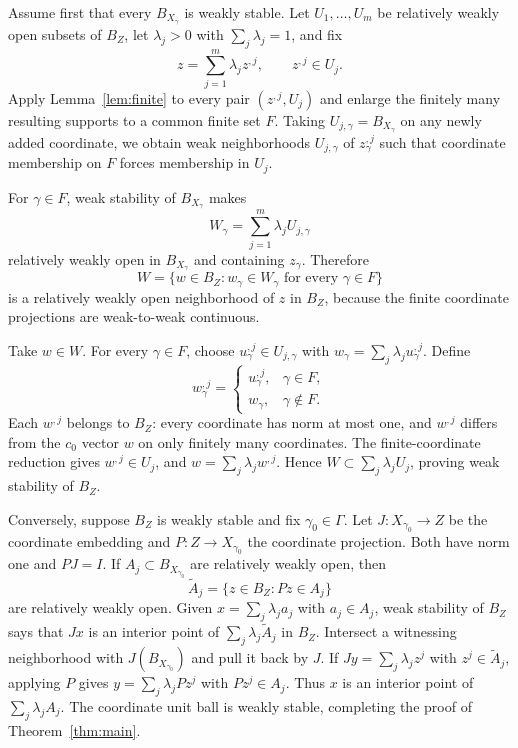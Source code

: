 \documentclass[11pt]{article}
\newcommand{\G}{\Gamma}
\begin{document}
Assume first that every $B_{X_\gamma}$ is weakly stable.  Let
$U_1,\dots,U_m$ be relatively weakly open subsets of $B_Z$, let
$\lambda_j>0$ with $\sum_j\lambda_j=1$, and fix
\[
 z=\sum_{j=1}^m\lambda_jz^{,j},\qquad z^{,j}\in U_j.
\]
Apply Lemma~\ref{lem:finite} to every pair $(z^{,j},U_j)$ and enlarge the
finitely many resulting supports to a common finite set $F$.  Taking
$U_{j,\gamma}=B_{X_\gamma}$ on any newly added coordinate, we obtain weak
neighborhoods $U_{j,\gamma}$ of $z^{,j}_\gamma$ such that coordinate
membership on $F$ forces membership in $U_j$.

For $\gamma\in F$, weak stability of $B_{X_\gamma}$ makes
\[
 W_\gamma=\sum_{j=1}^m\lambda_jU_{j,\gamma}
\]
relatively weakly open in $B_{X_\gamma}$ and containing $z_\gamma$.  Therefore
\[
 W=\{w\in B_Z:w_\gamma\in W_\gamma\text{ for every }\gamma\in F\}
\]
is a relatively weakly open neighborhood of $z$ in $B_Z$, because the finite
coordinate projections are weak-to-weak continuous.

Take $w\in W$.  For every $\gamma\in F$, choose
$u^{,j}_\gamma\in U_{j,\gamma}$ with
$w_\gamma=\sum_j\lambda_ju^{,j}_\gamma$.  Define
\[
 w^{,j}_\gamma=
 \begin{cases}
 u^{,j}_\gamma,&\gamma\in F,\\
 w_\gamma,&\gamma\notin F.
 \end{cases}
\]
Each $w^{,j}$ belongs to $B_Z$: every coordinate has norm at most one, and
$w^{,j}$ differs from the $c_0$ vector $w$ on only finitely many coordinates.
The finite-coordinate reduction gives $w^{,j}\in U_j$, and
$w=\sum_j\lambda_jw^{,j}$.  Hence
$W\subset\sum_j\lambda_jU_j$, proving weak stability of $B_Z$.

Conversely, suppose $B_Z$ is weakly stable and fix $\gamma_0\in\G$.  Let
$J:X_{\gamma_0}\to Z$ be the coordinate embedding and
$P:Z\to X_{\gamma_0}$ the coordinate projection.  Both have norm one and
$PJ=I$.  If $A_j\subset B_{X_{\gamma_0}}$ are relatively weakly open, then
\[
 \widetilde A_j=\{z\in B_Z:Pz\in A_j\}
\]
are relatively weakly open.  Given
$x=\sum_j\lambda_ja_j$ with $a_j\in A_j$, weak stability of $B_Z$ says that
$Jx$ is an interior point of $\sum_j\lambda_j\widetilde A_j$ in $B_Z$.
Intersect a witnessing neighborhood with $J(B_{X_{\gamma_0}})$ and pull it
back by $J$.  If $Jy=\sum_j\lambda_jz^j$ with
$z^j\in\widetilde A_j$, applying $P$ gives
$y=\sum_j\lambda_jPz^j$ with $Pz^j\in A_j$.  Thus $x$ is an interior point of
$\sum_j\lambda_jA_j$.  The coordinate unit ball is weakly stable, completing
the proof of Theorem~\ref{thm:main}.
\end{document}

